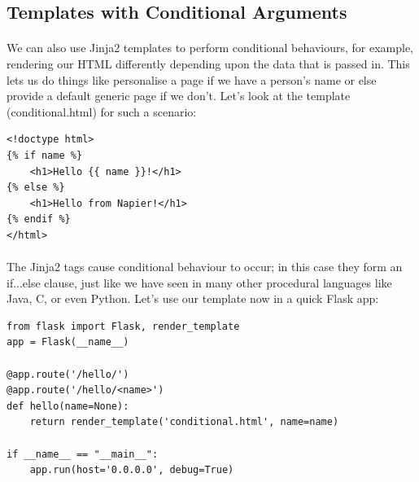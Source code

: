 \documentclass[12pt, a4paper, twoside]{book}
\begin{document}
\subsection{Templates with Conditional Arguments}
\label{templates-conditional}
\paragraph{} We can also use Jinja2 templates to perform conditional behaviours, for example, rendering our HTML differently depending upon the data that is passed in. This lets us do things like personalise a page if we have a person's name or else provide a default generic page if we don't. Let's look at the template (conditional.html) for such a scenario:

\begin{lstlisting}
<!doctype html>
{% if name %}
    <h1>Hello {{ name }}!</h1>
{% else %}
    <h1>Hello from Napier!</h1>
{% endif %}
</html>
\end{lstlisting}

\paragraph{} The Jinja2 tags cause conditional behaviour to occur; in this case they form an if...else clause, just like we have seen in many other procedural languages like Java, C, or even Python. Let's use our template now in a quick Flask app:

\begin{lstlisting}
from flask import Flask, render_template
app = Flask(__name__)

@app.route('/hello/')
@app.route('/hello/<name>')
def hello(name=None):
    return render_template('conditional.html', name=name)

if __name__ == "__main__":
    app.run(host='0.0.0.0', debug=True)
\end{lstlisting}
\end{document}
